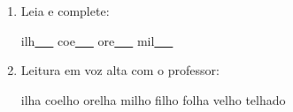 \begin{exercicio}
\begin{enumerate}[resume]
\begin{enumerate}[label=(\alph*)]
    \item O som da unidade é: ( ) oral ( ) nasal 

    \item A primeira sílaba de ILHA é: ( ) LHA ( ) LHE

    \item As palavras da unidade aparecem: ( ) no início ( ) no meio ( ) no fim das palavras

  \end{enumerate}

  \item Leia e complete:
  \begin{center}
  ilh\underline{~~~} \quad coe\underline{~~~} \quad ore\underline{~~~} \quad mil\underline{~~~}
  \end{center}

  \item Leitura em voz alta com o professor:
  \begin{center}
  ilha \quad coelho \quad orelha \quad milho \quad filho \quad folha \quad velho \quad telhado
  \end{center}

\end{enumerate}

\end{exercicio}



